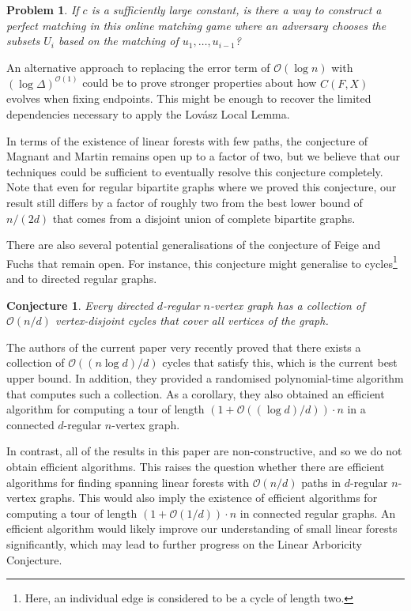 \documentclass[11pt]{article}
\theoremstyle{plain}
\newtheorem{conjecture}[theorem]{Conjecture}
\newtheorem{problem}[theorem]{Problem}
\theoremstyle{definition}
\newcommand{\cO}{\mathcal O}
\begin{document}
\begin{problem}
    If $c$ is a sufficiently large constant, is there a way to construct a perfect matching in this online matching game where an adversary chooses the subsets $U_i$ based on the matching of $u_1, \dots, u_{i-1}$?
\end{problem}

An alternative approach to replacing the error term of $\cO(\log n)$ with $(\log \Delta)^{\cO(1)}$ could be to prove stronger properties about how $C(F,X)$ evolves when fixing endpoints. This might be enough to recover the limited dependencies necessary to apply the Lov\'asz Local Lemma.

In terms of the existence of linear forests with few paths, the conjecture of Magnant and Martin remains open up to a factor of two, but we believe that our techniques could be sufficient to eventually resolve this conjecture completely. Note that even for regular bipartite graphs where we proved this conjecture, our result still differs by a factor of roughly two from the best lower bound of $n/(2d)$ that comes from a disjoint union of complete bipartite graphs.

There are also several potential generalisations of the conjecture of Feige and Fuchs that remain open. For instance, this conjecture might generalise to cycles\footnote{Here, an individual edge is considered to be a cycle of length two.} and to directed regular graphs.

\begin{conjecture}
    Every directed $d$-regular $n$-vertex graph has a collection of $\cO(n/d)$ vertex-disjoint cycles that cover all vertices of the graph.
\end{conjecture}

The authors of the current paper \cite{christoph2025cyclefactors} very recently proved that there exists a collection of $\cO((n \log d)/d)$ cycles that satisfy this, which is the current best upper bound. In addition, they provided a randomised polynomial-time algorithm that computes such a collection. As a corollary, they also obtained an efficient algorithm for computing a tour of length $(1 + \cO((\log d)/d)) \cdot n$ in a connected $d$-regular $n$-vertex graph.

In contrast, all of the results in this paper are non-constructive, and so we do not obtain efficient algorithms. This raises the question whether there are efficient algorithms for finding spanning linear forests with $\cO(n/d)$ paths in $d$-regular $n$-vertex graphs. This would also imply the existence of efficient algorithms for computing a tour of length $(1 + \cO(1/d)) \cdot n$ in connected regular graphs. An efficient algorithm would likely improve our understanding of small linear forests significantly, which may lead to further progress on the Linear Arboricity Conjecture.
\end{document}
